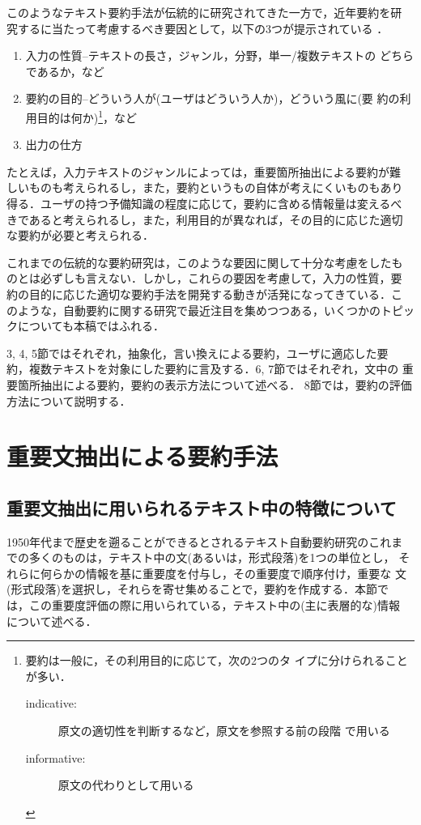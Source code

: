 このようなテキスト要約手法が伝統的に研究されてきた一方で，近年要約を研
究するに当たって考慮するべき要因として，以下の3つが提示されている
\cite{sparck:98:a}．
\begin{enumerate}
\item 入力の性質--テキストの長さ，ジャンル，分野，単一/複数テキストの
どちらであるか，など
\item 要約の目的--どういう人が(ユーザはどういう人か)，どういう風に(要
約の利用目的は何か)\footnote{
要約は一般に，その利用目的に応じて，次の2つのタ
イプに分けられることが多い\cite{hand:97:a}．
\begin{description}
\item[indicative:] 原文の適切性を判断するなど，原文を参照する前の段階
で用いる
\item[informative:] 原文の代わりとして用いる
\end{description}
}，など
\item 出力の仕方
\end{enumerate}
たとえば，入力テキストのジャンルによっては，重要箇所抽出による要約が難
しいものも考えられるし，また，要約というもの自体が考えにくいものもあり
得る．ユーザの持つ予備知識の程度に応じて，要約に含める情報量は変えるべ
きであると考えられるし，また，利用目的が異なれば，その目的に応じた適切
な要約が必要と考えられる．

これまでの伝統的な要約研究は，このような要因に関して十分な考慮をしたも
のとは必ずしも言えない．しかし，これらの要因を考慮して，入力の性質，要
約の目的に応じた適切な要約手法を開発する動きが活発になってきている．こ
のような，自動要約に関する研究で最近注目を集めつつある，いくつかのトピッ
クについても本稿ではふれる．

3, 4, 5節ではそれぞれ，抽象化，言い換えによる要約，ユーザに適応した要
約，複数テキストを対象にした要約に言及する．6, 7節ではそれぞれ，文中の
重要箇所抽出による要約，要約の表示方法について述べる．
8節では，要約の評価方法について説明する．

\section{重要文抽出による要約手法}

\subsection{重要文抽出に用いられるテキスト中の特徴について}

1950年代まで歴史を遡ることができるとされるテキスト自動要約研究のこれま
での多くのものは，テキスト中の文(あるいは，形式段落)を1つの単位とし，
それらに何らかの情報を基に重要度を付与し，その重要度で順序付け，重要な
文(形式段落)を選択し，それらを寄せ集めることで，要約を作成する．本節で
は，この重要度評価の際に用いられている，テキスト中の(主に表層的な)情報
について述べる．

